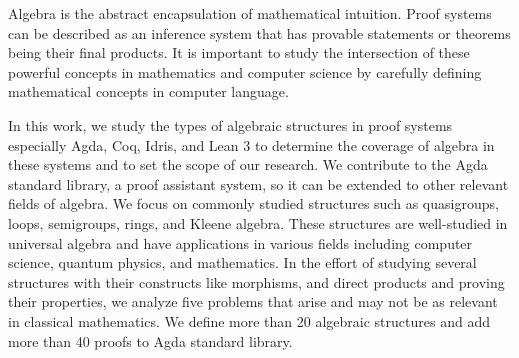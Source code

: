 Algebra is the abstract encapsulation of mathematical intuition. Proof systems
can be described as an inference system that has provable statements or theorems
being their final products. It is important to study the intersection of these
powerful concepts in mathematics and computer science by carefully defining
mathematical concepts in computer language.

In this work, we study the types of algebraic structures in proof systems
especially Agda, Coq, Idris, and Lean 3 to determine the coverage of algebra in
these systems and to set the scope of our research. We contribute to the Agda
standard library, a proof assistant system, so it can be extended to other
relevant fields of algebra. We focus on commonly studied structures such as
quasigroups, loops, semigroups, rings, and Kleene algebra. These structures are
well-studied in universal algebra and have applications in various fields
including computer science, quantum physics, and mathematics. In the effort of
studying several structures with their constructs like morphisms, and direct
products and proving their properties, we analyze five problems that arise and
may not be as relevant in classical mathematics. We define more than 20
algebraic structures and add more than 40 proofs to Agda standard library.